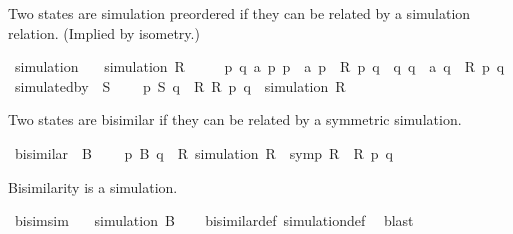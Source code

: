 \begin{isabellebody}
\begin{isamarkuptext}%
Two states are simulation preordered if they can be related by
  a simulation relation. (Implied by isometry.)%
\end{isamarkuptext}\isamarkuptrue%
\isamarkupfalse%
\ simulation\isanewline
\ \ \ {\isacartoucheopen}simulation\ R\ {\isasymequiv}\isanewline
\ \ \ \ {\isasymforall}p\ q\ a\ p{\isacharprime}{\kern0pt}{\isachardot}{\kern0pt}\ p\ {\isasymmapsto}\ a\ p{\isacharprime}{\kern0pt}\ {\isasymand}\ R\ p\ q\ {\isasymlongrightarrow}\ {\isacharparenleft}{\kern0pt}{\isasymexists}q{\isacharprime}{\kern0pt}{\isachardot}{\kern0pt}\ q\ {\isasymmapsto}\ a\ q{\isacharprime}{\kern0pt}\ {\isasymand}\ R\ p{\isacharprime}{\kern0pt}\ q{\isacharprime}{\kern0pt}{\isacharparenright}{\kern0pt}{\isacartoucheclose}\isanewline
\isanewline
{}\isamarkupfalse%
\ simulated{\isacharunderscore}{\kern0pt}by\ {\isacharparenleft}{\kern0pt}\ {\isacartoucheopen}{\isasymlesssim}S{\isacartoucheclose}\ {}{}{\isacharparenright}{\kern0pt}\isanewline
\ \ \ {\isacartoucheopen}p\ {\isasymlesssim}S\ q\ {\isasymequiv}\ {\isasymexists}R{\isachardot}{\kern0pt}\ R\ p\ q\ {\isasymand}\ simulation\ R{\isacartoucheclose}%
\begin{isamarkuptext}%
Two states are bisimilar if they can be related by a symmetric simulation.%
\end{isamarkuptext}\isamarkuptrue%
\isamarkupfalse%
\ bisimilar\ {\isacharparenleft}{\kern0pt}\ {\isacartoucheopen}{\isasymsimeq}B{\isacartoucheclose}\ {}{}{\isacharparenright}{\kern0pt}\ \isanewline
\ \ {\isacartoucheopen}p\ {\isasymsimeq}B\ q\ {\isasymequiv}\ {\isasymexists}R{\isachardot}{\kern0pt}\ simulation\ R\ {\isasymand}\ symp\ R\ {\isasymand}\ R\ p\ q{\isacartoucheclose}%
\begin{isamarkuptext}%
Bisimilarity is a simulation.%
\end{isamarkuptext}\isamarkuptrue%
\isamarkupfalse%
\ bisim{\isacharunderscore}{\kern0pt}sim{\isacharcolon}{\kern0pt}\isanewline
\ \ \ {\isacartoucheopen}simulation\ {\isacharparenleft}{\kern0pt}{\isasymsimeq}B{\isacharparenright}{\kern0pt}{\isacartoucheclose}\isanewline
%
\isadelimproof
\ \ %
\endisadelimproof
%
\isatagproof
{}\isamarkupfalse%
\ bisimilar{\isacharunderscore}{\kern0pt}def\ simulation{\isacharunderscore}{\kern0pt}def\ \isamarkupfalse%
\ blast%
\endisatagproof
{\isafoldproof}%
%
\isadelimproof
\isanewline
%
\endisadelimproof
\isanewline
\isanewline
{}\isamarkupfalse%
\isanewline
%
\isadelimtheory
%
\endisadelimtheory
%
\isatagtheory
{}\isamarkupfalse%
%
\endisatagtheory
{\isafoldtheory}%
%
\isadelimtheory
%
\endisadelimtheory
%
\end{isabellebody}%
